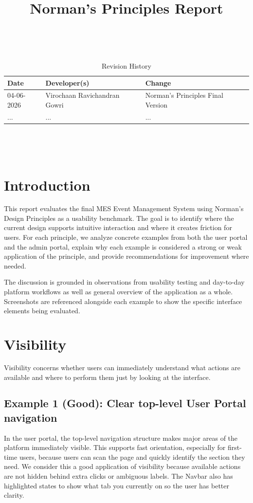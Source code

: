 \documentclass[12pt]{article}
\title{Norman's Principles Report\\\progname}
\author{\authname}
\date{}
\begin{document}
\maketitle
\thispagestyle{empty}

~\newpage


\begin{table}[hp]
\caption{Revision History} \label{TblRevisionHistory}
\begin{tabularx}{\textwidth}{llX}
\toprule
\textbf{Date} & \textbf{Developer(s)} & \textbf{Change}\\
\midrule
04-06-2026 & Virochaan Ravichandran Gowri & Norman's Principles Final Version\\

... & ... & ...\\
\bottomrule
\end{tabularx}
\end{table}

~\newpage

\tableofcontents

~\newpage

\section{Introduction}
This report evaluates the final MES Event Management System using Norman's Design Principles as a usability benchmark. The goal is to identify where the current design supports intuitive interaction and where it creates friction for users. For each principle, we analyze concrete examples from both the user portal and the admin portal, explain why each example is considered a strong or weak application of the principle, and provide recommendations for improvement where needed.

The discussion is grounded in observations from usability testing and day-to-day platform workflows as well as general overview of the application as a whole. Screenshots are referenced alongside each example to show the specific interface elements being evaluated.

\section{Visibility}
Visibility concerns whether users can immediately understand what actions are available and where to perform them just by looking at the interface.

\subsection{Example 1 (Good): Clear top-level User Portal navigation}
In the user portal, the top-level navigation structure makes major areas of the platform immediately visible. This supports fast orientation, especially for first-time users, because users can scan the page and quickly identify the section they need. We consider this a good application of visibility because available actions are not hidden behind extra clicks or ambiguous labels. The Navbar also has highlighted states to show what tab you currently on so the user has better clarity. 
\end{document}

